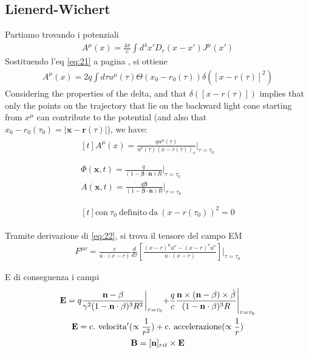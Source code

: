 \documentclass[a4paper, twocolumn]{article}
\begin{document}
\subsection{Lienerd-Wichert}
\label{sec:lienerd-wichert}
Partiamo trovando i potenziali
\begin{align}
  \label{eq:17}
  A^\mu(x)=\frac{4\pi}{c}\int d^4x'D_r(x-x')J^\mu(x')
\end{align}
Sostituendo l'eq \ref{eq:21} a pagina \pageref{eq:21}, si ottiene
\begin{align}
  \label{eq:22}
  A^\mu(x)=2q \int d\tau u^\mu(\tau)\Theta(x_0-r_0(\tau))\delta([x-r(\tau)]^2)
\end{align}
Considering the properties of the delta, and that  $\delta([x-r(\tau)])$ implies that only the points on the trajectory that lie on the backward light cone starting from $x^\mu$ can contribute to the potential (and also that $x_0-r_0(\tau_0)=\left| \mathbf{x}-\mathbf{r}(\tau) \right|$), we have:
\begin{gather}
  \label{eq:23}
  \begin{aligned}[t]
    A^\mu(x)=\frac{qu^\mu(\tau)}{u^\nu(\tau)(x-r(\tau))_{\nu}}\bigg\rvert_{\tau=\tau_0} \\
  \end{aligned} \\ 
  \begin{split}
    \Phi(\mathbf{x},t)=\frac{q}{(1-\boldsymbol{\beta}\cdot\mathbf{n})R}\bigg\rvert_{\tau=\tau_0} \\
    A(\mathbf{x},t)=\frac{q\boldsymbol{\beta}}{(1-\boldsymbol{\beta}\cdot\mathbf{n})R}\bigg\rvert_{\tau=\tau_0} \\  
  \end{split} \\
  \begin{aligned}[t]
    \mathrm{con}~ \tau_0~ \mathrm{definito~da} ~(x-r(\tau_0))^2=0
  \end{aligned}  
\end{gather}

Tramite derivazione di \ref{eq:22}, si trova il tensore del campo EM
\begin{align}
  \label{eq:24}
  F^{\mu\nu}=\frac{e}{u\cdot(x-r)}\frac{d}{d\tau}\left[ \frac{(x-r)^\mu u^\nu - (x-r)^\nu u^\nu}{u\cdot(x-r)}   \right]   \Biggl\rvert_{\tau=\tau_0}
\end{align}

E di conseguenza i campi
\begin{gather}
  \label{eq:25}
  \mathbf{E}=q \frac{\mathbf{n}-\mathbf{\beta}}{\gamma^2(1-\mathbf{n}\cdot\mathbf{\beta})^3R^2} \biggl\rvert_{\tau=\tau_0}  +\frac{q}{c}\frac{\mathbf{n}\times(\mathbf{n}-\mathbf{\beta})\times\dot{\mathbf{\beta}}}{(1-\mathbf{n}\cdot\mathbf{\beta})^3 R}\Biggl\rvert_{\tau=\tau_0} \\
  \mathbf{E}=\mathrm{c.~velocita'}(\propto \frac{1}{r^2}) + \mathrm{c.~accelerazione}(\propto \frac{1}{r}) \notag \\ 
  \mathbf{B}=[\mathbf{n}]_{rit}\times\mathbf{E} 
\end{gather}
\end{document}
